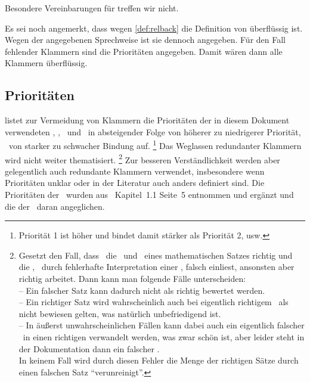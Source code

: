 Besondere Vereinbarungen für \chrqt{$\opubsp$} treffen wir nicht.

Es sei noch angemerkt, dass wegen \eqref{def:relback} die Definition von \chrqt{$\metarep$}  überflüssig ist.
Wegen der angegebenen Sprechweise ist sie dennoch angegeben.
Für den Fall fehlender Klammern sind die Prioritäten  angegeben.
Damit wären dann alle Klammern  überflüssig.

\subsection{Prioritäten}%
\label{sub:Prioritäten}

 listet zur Vermeidung von Klammern die Prioritäten der in diesem Dokument verwendeten \Operationen, \Relationen, \Junktoren\ und \Definitionen\ in absteigender Folge von höherer zu niedrigerer Priorität, \textdh\ von starker zu schwacher Bindung auf.%
\footnote{Priorität 1 ist höher und bindet damit stärker als Priorität 2, usw.}
Das Weglassen redundanter Klammern wird  nicht weiter thematisiert.%
\footnote{%
	Gesetzt den Fall, dass \ASBA\ die \Voraussetzungen\ und \Folgerungen\ eines mathematischen Satzes richtig und die \Beweisschritte, \textzB\ durch fehlerhafte Interpretation einer \Formel, falsch einliest, ansonsten aber richtig arbeitet.
	Dann kann man folgende Fälle unterscheiden:\\
	-- Ein falscher Satz kann dadurch nicht als richtig bewertet werden.\\
	-- Ein richtiger Satz wird wahrscheinlich auch bei eigentlich richtigem \Beweis\ als nicht bewiesen gelten, was natürlich unbefriedigend ist.\\
	-- In äußerst unwahrscheinlichen Fällen kann dabei auch ein eigentlich falscher \Beweis\ in einen richtigen verwandelt werden, was zwar schön ist, aber leider steht in der Dokumentation dann ein falscher \Beweis.\\
	In keinem Fall wird durch diesen Fehler die Menge der richtigen Sätze durch einen falschen Satz \enquote{verunreinigt}.
}
Zur besseren Verständlichkeit werden aber gelegentlich auch redundante Klammern verwendet, insbesondere wenn Prioritäten unklar oder in der Literatur auch anders definiert sind.
Die Prioritäten der \Junktoren\ wurden aus~\cite{bib:Rautenberg} Kapitel~1.1 Seite~5 entnommen und ergänzt und die der \Metaoperationen\ daran angeglichen.


